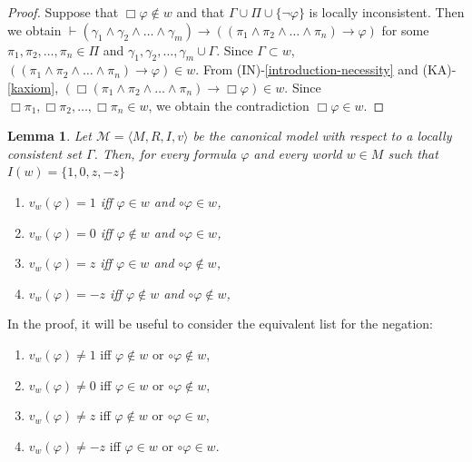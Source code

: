 \documentclass{amsart}
\newtheorem{lemma}{Lemma}[section]
\newcommand{\so}{\rightarrow}
\newcommand{\pair}[1]{\langle #1 \rangle}
\begin{document}
\begin{proof}
    Suppose that $\Box \varphi \notin w$ and that $\Gamma \cup \Pi  \cup \{\lnot \varphi\}$ is locally inconsistent. Then we obtain $\vdash (\gamma_1 \land \gamma_2\land \ldots \land \gamma_m) \to ((\pi_1 \land \pi_2 \land \ldots \land \pi_n) \so \varphi)$ for some $\pi_1, \pi_2, \ldots, \pi_n \in \Pi$ and $\gamma_1, \gamma_2, \ldots, \gamma_m \cup\Gamma$. Since $\Gamma\subset w$,  $((\pi_1 \land \pi_2 \land \ldots \land \pi_n)\so \varphi)\in w$.
    From (IN)-\ref{introduction-necessity} and (KA)-\ref{kaxiom}, $(\Box (\pi_1 \land \pi_2 \land \ldots \land \pi_n) \so \Box \varphi) \in w$. Since $\Box \pi_1, \Box \pi_2, \ldots, \Box \pi_n \in w$, we obtain the contradiction $\Box \varphi \in w$.
\end{proof}

\begin{lemma}\label{valuation_canonical_model}
    Let $\mathcal{M} = \pair{M, R,I, v}$ be the canonical model with respect to a locally consistent set $\Gamma$. Then, for every formula $\varphi$ and every world $w \in M$ such that $I(w) = \{1,0,z,-z\}$
    \begin{enumerate}
        \item $v_w(\varphi) = 1$ iff $\varphi \in w$ and $\circ \varphi \in w$,
        \item $v_w(\varphi) = 0$ iff $\varphi \notin w$ and $\circ \varphi \in w$,
        \item $v_w(\varphi) = z$ iff $\varphi \in w$ and $\circ \varphi \notin w$,
        \item $v_w(\varphi) = -z$ iff $\varphi \notin w$ and $\circ \varphi \notin w$,
    \end{enumerate}
\end{lemma}

In the proof, it will be useful to consider the equivalent list for the negation:
\begin{enumerate}
    \item $v_w(\varphi) \neq 1$ iff $\varphi \notin w$ or $\circ \varphi \notin w$,
    \item $v_w(\varphi) \neq 0$ iff $\varphi \in w$ or $\circ \varphi \notin w$,
    \item $v_w(\varphi) \neq z$ iff $\varphi \notin w$ or $\circ \varphi \in w$,
    \item $v_w(\varphi) \neq -z$ iff $\varphi \in w$ or $\circ \varphi \in w$.
\end{enumerate}
\end{document}
